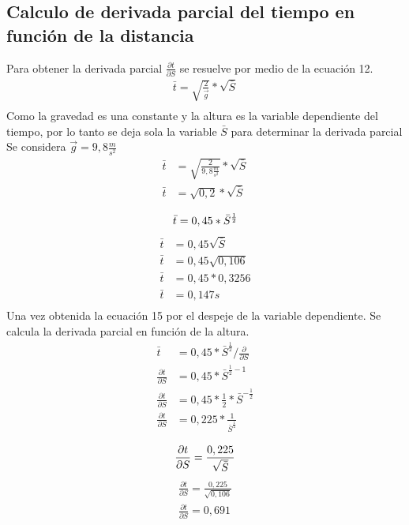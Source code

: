 \documentclass[runningheads]{llncs}
\begin{document}
    \subsection{Calculo de derivada parcial del tiempo en función de la distancia}
    Para obtener la derivada parcial $\frac{\partial t}{\partial S}$ se resuelve por medio de la ecuación 12.
    \begin{align*}
        \bar{t}=\sqrt{\frac{2}{\overrightarrow{g}}}*\sqrt{\bar{S}}\\
    \end{align*}
    Como la gravedad es una constante y la altura es la variable dependiente del tiempo, por lo tanto se deja sola la variable $\bar{S}$ para determinar la derivada parcial\\
    Se considera $\vec{g}=9,8 \frac{m}{{s}^{2}}$
    \begin{align*}
        \bar{t} & =\sqrt{\frac{2}{{9,8 \frac{m}{{s}^{2}}}}}*\sqrt{\bar{S}}\\
        \bar{t} & =\sqrt{0,2}*\sqrt{\bar{S}}\\ 
    \end{align*}
    \begin{equation}
        \bar{t} =0,45*\bar{S}^{\frac{1}{2}}\\
    \end{equation}
    \begin{align*}
        \bar{t} &=0,45\sqrt{\bar{S}}\\
        \bar{t} &=0,45\sqrt{0,106}\\
        \bar{t} &=0,45*0,3256\\
        \bar{t} &=0,147 s \tag{M}\\
    \end{align*}
    Una vez obtenida la ecuación 15 por el despeje de la variable dependiente. Se calcula la derivada parcial en función de la altura. 
    \begin{align*}
        \bar{t}                          & = 0,45*\bar{S}^{\frac{1}{2}} / \frac{\partial}{\partial S} \\
        \frac{\partial t}{\partial S}    & = 0,45*\bar{S}^{\frac{1}{2}-1}\\
        \frac{\partial t}{\partial S}    & = 0,45*\frac{1}{2}*\bar{S}^{-\frac{1}{2}}\\
        \frac{\partial t}{\partial S}    & = 0,225*\frac{1}{\bar{S}^{\frac{1}{2}}}\\
    \end{align*}
    \begin{equation}
        \frac{\partial t}{\partial S}      = \frac{0,225}{\sqrt{\bar{S}}}\\
    \end{equation}
    \begin{align*}
        \frac{\partial t}{\partial S} = \frac{0,225}{\sqrt{0,106}}\\
        \frac{\partial t}{\partial S} = 0,691 \tag{N}\\
    \end{align*}
\end{document}
